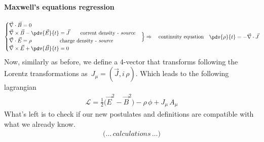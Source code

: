 \documentclass[class=article]{standalone}
\begin{document}
\paragraph{Maxwell's equations regression}
\begin{equation*}
\begin{split}
\begin{cases}
\vec \nabla \cdot \vec B = 0 \\
\vec \nabla \times \vec B - \pdv{\vec E}{t} = \vec J   \quad\quad \mbox{corrent density - \emph{source}} \\
\vec \nabla \cdot \vec E = \rho   \quad\quad\quad\quad\quad \; \mbox{charge density - \emph{source}} \\
\vec \nabla \times \vec E + \pdv{\vec B}{t} = 0
\end{cases}
\end{split} 
\Big\} \Rightarrow\quad \mbox{continuity equation} \quad
\begin{split}
\pdv{ \rho}{t} = - \vec \nabla \cdot \vec J 
\end{split}
\end{equation*}
Now, similarly as before, we define a 4-vector that transforms following the Lorentz transformations as $\, J_{\mu} = (\vec J , i \, \rho) $.
Which leads to the following lagrangian
\begin{equation*}
\begin{split}
\mathcal{L} = \frac{1}{2} \Big( \vec E^2 - \vec B^2 \Big) - \rho \, \phi + J_{\mu}\,A_{\mu}
\end{split}
\end{equation*}
What's left is to check if our new postulates and definitions are compatible with what we already know.
\begin{equation*}
\begin{split}
\Big( \ldots \,calculations\, \ldots \Big)
\end{split}
\end{equation*}
\end{document}
